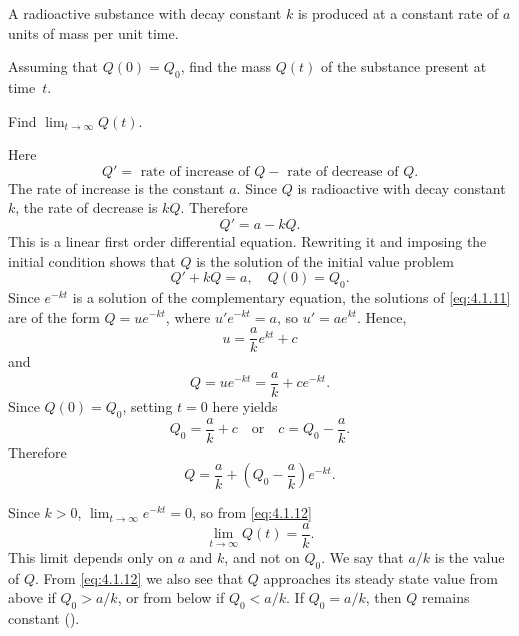 
\begin{example}\label{example:4.1.4}
A radioactive substance with decay constant $k$ is produced at a
constant rate of $a$ units of mass per unit time.
\begin{alist}
\item %
Assuming that $Q(0)=Q_0$, find the mass $Q(t)$ of the
substance present at time~$t$.

\item %
Find $\lim_{t\to\infty} Q(t)$.
\end{alist}
\end{example}

\begin{alistSolution}
\item Here
\[
Q'=\text{ rate of increase of } Q - \text{ rate of decrease of } Q.
\]
The rate of increase is the constant $a$. Since $Q$ is radioactive
with decay constant $k$, the rate of decrease is $kQ$. Therefore
\[
Q'=a-kQ.
\]
This is a linear first order differential equation. Rewriting it and
imposing the initial condition shows that $Q$ is the solution of the
initial value problem
\begin{equation}  \label{eq:4.1.11}
Q'+kQ=a, \quad Q(0)=Q_0.
\end{equation}
Since
$e^{-kt}$ is a solution of the complementary equation, the solutions
of \eqref{eq:4.1.11} are of the form $Q=ue^{-kt}$, where $u'e^{-kt}=a$, so
$u'=ae^{kt}$. Hence,
\[
u=\frac{a}{k}e^{kt}+c
\]
and
\[
Q=ue^{-kt}=\frac{a}{k}+ce^{-kt}.
\]
 Since $Q(0)=Q_0$, setting $t=0$ here yields
\[
Q_0=\frac{a}{k}+c  \quad\text{or}\quad c=Q_0-\frac{a}{k}.
\]
 Therefore
\begin{equation} \label{eq:4.1.12}
Q=\frac{a}{k}+\left(Q_0-\frac{a}{k}\right)e^{-kt}.
\end{equation}

\item
Since $k > 0$,  $\lim_{t\to\infty} e^{-kt}=0$, so
from \eqref{eq:4.1.12}
\[
\lim_{t\to\infty} Q(t)=\frac{a}{k}.
\]
This limit depends only on $a$ and $k$, and not on $Q_0$.
We say that $a/k$ is the  value of $Q$. From
\eqref{eq:4.1.12} we also see that $Q$ approaches its steady state value
from above if $Q_0 > a/k$, or from below if $Q_0 < a/k$. If $Q_0=a/k$,
then $Q$ remains constant ().


\end{alistSolution}
